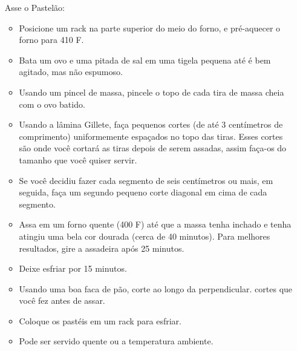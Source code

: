 \documentclass [11pt, letterpaper] {article}
\begin{document}
\begin {description}
\begin{enumerate}
\item [Asse o Pastel\~ao:] \ \\
        \begin {itemize}
        \item Posicione um rack na parte superior do meio do forno,
        e pré-aquecer o forno para 410 F.
        \item Bata um ovo e uma pitada de sal em uma tigela pequena até
        é bem agitado, mas não espumoso.
        \item Usando um pincel de massa, pincele o topo de cada
        tira de massa cheia com o ovo batido.
        \item Usando a l\^amina Gillete, faça pequenos 
        cortes (de até 3 cent\'imetros de comprimento) uniformemente espaçados no topo das tiras. Esses cortes são
        onde você cortará as tiras depois de serem assadas, assim
        faça-os do tamanho que voc\^e quiser servir.
        \item Se você decidiu fazer cada segmento de seis cent\'imetros ou mais,
        em seguida, faça um segundo pequeno corte diagonal em cima de cada segmento.
        \item Assa em um forno quente (400 F) até que a massa tenha inchado e tenha
        atingiu uma bela cor dourada (cerca de 40 minutos). Para melhores resultados, gire a assadeira após 25 minutos.
        \item Deixe esfriar por 15 minutos.
        \item Usando uma boa faca de pão, corte ao longo da perpendicular.
        cortes que você fez antes de assar.
        \item Coloque os pastéis em um rack para esfriar.
        \item Pode ser servido quente ou a temperatura ambiente.
        \end {itemize}
\end {enumerate}
\end {description}
\end{document}
